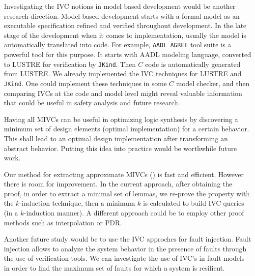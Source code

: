 Investigating the IVC notions in model based development would be another research direction. Model-based development starts with a formal model as an executable specification refined and verified throughout development. In the late stage of the development when it comes to implementation, usually the model is automatically translated into code. For example,  \texttt{AADL AGREE} tool suite is a powerful tool for this purpose. It starts with AADL modeling language, converted to LUSTRE for verification by \texttt{JKind}. Then $C$ code is automatically generated from LUSTRE. We already implemented the IVC techniques for LUSTRE and \texttt{JKind}. One could implement these techniques in some $C$ model checker, and then comparing IVCs at the code and model level might reveal valuable information that could be useful in safety analysis and future research.

Having all MIVCs can be useful in optimizing logic synthesis by discovering a minimum set of design elements (optimal implementation) for a certain behavior. This shall lead to an optimal design implementation after transforming an abstract behavior. Putting this idea into practice would be worthwhile future work.

Our method for extracting approximate MIVCs (\ucalg) is fast and efficient. However there is room for improvement. In the current approach, after obtaining the proof, in order to extract a minimal set of lemmas, we re-prove the property with the $k$-induction technique, then a minimum $k$ is calculated to build IVC queries (in a $k$-induction manner). A different approach could be to employ other proof methods such as interpolation or PDR.

Another future study would be to use the IVC approches for fault injection. Fault injection allows to analyze the system behavior in the presence of faults through the use of verification tools. We can investigate the use of IVC's in fault models in order to find the maximum set of faults for which a system is resilient.

